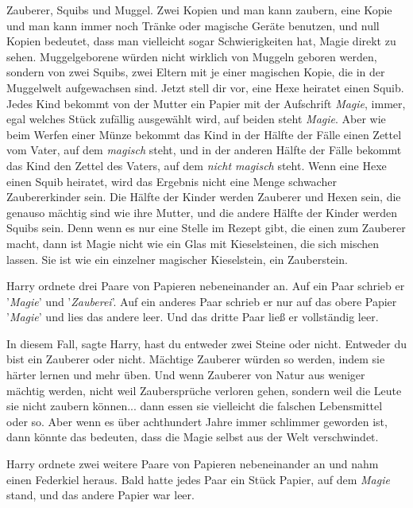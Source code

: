 Zauberer, Squibs und Muggel. Zwei Kopien und man kann zaubern, eine Kopie und
man kann immer noch Tränke oder magische Geräte benutzen, und null Kopien
bedeutet, dass man vielleicht sogar Schwierigkeiten hat, Magie direkt zu sehen.
Muggelgeborene würden nicht wirklich von Muggeln geboren werden, sondern von
zwei Squibs, zwei Eltern mit je einer magischen Kopie, die in der Muggelwelt
aufgewachsen sind. Jetzt stell dir vor, eine Hexe heiratet einen Squib. Jedes
Kind bekommt von der Mutter ein Papier mit der Aufschrift \glqq
\emph{Magie}\grqq{}, immer, egal welches Stück zufällig ausgewählt wird, auf
beiden steht \glqq{}\emph{Magie}\grqq{}. Aber wie beim Werfen einer Münze bekommt
das Kind in der Hälfte der Fälle einen Zettel vom Vater, auf dem \glqq
\emph{magisch}\grqq{} steht, und in der anderen Hälfte der Fälle bekommt das
Kind den Zettel des Vaters, auf dem \emph{\glqq{}nicht magisch\grqq{}} steht.
Wenn eine Hexe einen Squib heiratet, wird das Ergebnis nicht eine Menge
schwacher Zaubererkinder sein. Die Hälfte der Kinder werden Zauberer und Hexen
sein, die genauso mächtig sind wie ihre Mutter, und die andere Hälfte der Kinder
werden Squibs sein. Denn wenn es nur eine Stelle im Rezept gibt, die einen zum
Zauberer macht, dann ist Magie nicht wie ein Glas mit Kieselsteinen, die sich
mischen lassen. Sie ist wie ein einzelner magischer Kieselstein, ein
Zauberstein.\grqq{}

Harry ordnete drei Paare von Papieren nebeneinander an. Auf ein Paar schrieb er
'\emph{Magie}' und '\emph{Zauberei}'. Auf ein anderes Paar schrieb er nur auf
das obere Papier '\emph{Magie}' und lies das andere leer. Und das dritte Paar
ließ er vollständig leer.

\glqq{}In diesem Fall\grqq{}, sagte Harry, \glqq{}hast du entweder zwei Steine
oder nicht. Entweder du bist ein Zauberer oder nicht. Mächtige Zauberer würden
so werden, indem sie härter lernen und mehr üben. Und wenn Zauberer von Natur
aus weniger mächtig werden, nicht weil Zaubersprüche verloren gehen, sondern
weil die Leute sie nicht zaubern können... dann essen sie vielleicht die
falschen Lebensmittel oder so. Aber wenn es über achthundert Jahre immer
schlimmer geworden ist, dann könnte das bedeuten, dass die Magie selbst aus der
Welt verschwindet.\grqq{}

Harry ordnete zwei weitere Paare von Papieren nebeneinander an und nahm einen
Federkiel heraus. Bald hatte jedes Paar ein Stück Papier, auf dem \glqq
\emph{Magie}\grqq{} stand, und das andere Papier war leer.

